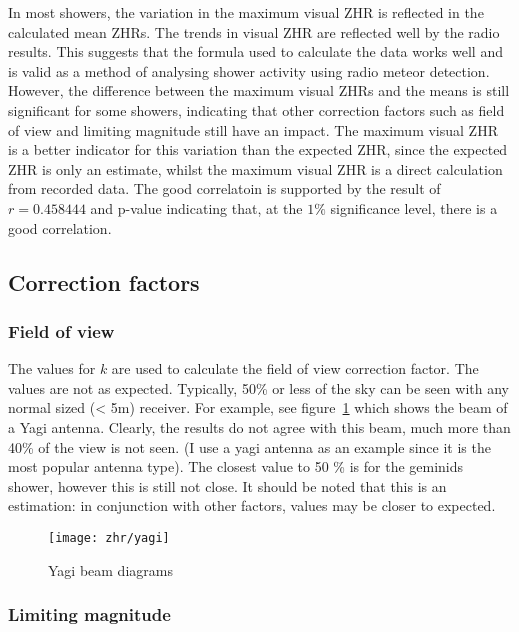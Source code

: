 In most showers, the variation in the maximum visual ZHR is reflected in the
calculated mean ZHRs. The trends in visual ZHR are reflected well by the radio
results. This suggests that the formula used to calculate the data works well
and is valid as a method of analysing shower activity using radio meteor
detection.  However, the difference between the maximum visual ZHRs and the
means is still significant for some showers, indicating that other correction
factors such as field of view and limiting magnitude still have an impact. The
maximum visual ZHR is a better indicator for this variation than the expected
ZHR, since the expected ZHR is only an estimate, whilst the maximum visual ZHR
is a direct calculation from recorded data. The good correlatoin is supported by
the result of $r = 0.458444$ and p-value indicating that, at the $1\%$
significance level, there is a good correlation.

\subsection{Correction factors}

\subsubsection{Field of view}

The values for $k$ are used to calculate the field of view correction factor.
The values are not as expected. Typically, 50\% or less of the sky can be seen
with any normal sized (< 5m) receiver. For example, see
figure~\ref{fig:zhr:beam} which shows the beam of a Yagi antenna. Clearly, the
results do not agree with this beam, much more than 40\% of the view is not
seen. (I use a yagi antenna as an example since it is the most popular antenna
type). The closest value to 50 \% is for the geminids shower, however this is
still not close. It should be noted that this is an estimation: in conjunction
with other factors, values may be closer to expected.  

\begin{figure}[h!]
	\centering 
	\texttt{[image: zhr/yagi]} 
	\caption{Yagi beam diagrams \cite{yagi} \label{fig:zhr:beam}} 
\end{figure}

\subsubsection{Limiting magnitude}

